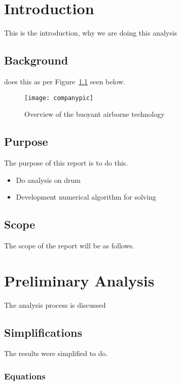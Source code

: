 
\chapter{Introduction}
\label{chapt:intro}

This is the introduction, why we are doing this analysis

\section{Background} %

\Company does this as per Figure~\ref{fig:companypic} seen below.

\begin{figure}[!htbp]
    \centering
    \texttt{[image: companypic]}
    \caption{Overview of the buoyant airborne technology}
    \label{fig:companypic}
\end{figure}


\section{Purpose}
The purpose of this report is to do this.
\begin{itemize}
    \item Do analysis on drum
    \item Development numerical algorithm for solving
\end{itemize}


\section{Scope} %

The scope of the report will be as follows.

\chapter{Preliminary Analysis}
The analysis process is discussed
\section{Simplifications}
The results were simplified to do.

\subsection{Equations}

